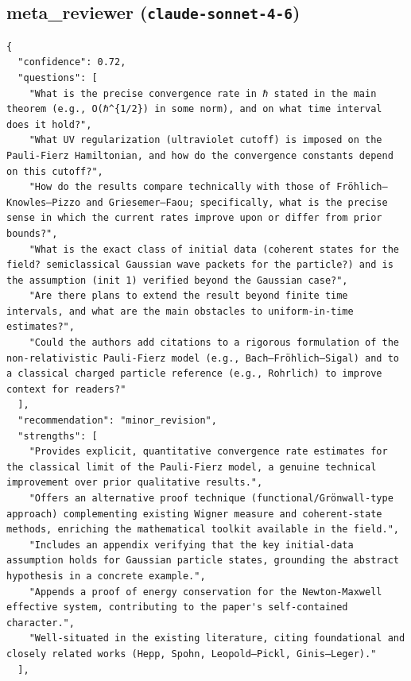 \documentclass[11pt]{article}
\begin{document}
\subsection*{meta_reviewer (\texttt{claude-sonnet-4-6})}
\begin{verbatim}
{
  "confidence": 0.72,
  "questions": [
    "What is the precise convergence rate in ℏ stated in the main theorem (e.g., O(ℏ^{1/2}) in some norm), and on what time interval does it hold?",
    "What UV regularization (ultraviolet cutoff) is imposed on the Pauli-Fierz Hamiltonian, and how do the convergence constants depend on this cutoff?",
    "How do the results compare technically with those of Fröhlich–Knowles–Pizzo and Griesemer–Faou; specifically, what is the precise sense in which the current rates improve upon or differ from prior bounds?",
    "What is the exact class of initial data (coherent states for the field? semiclassical Gaussian wave packets for the particle?) and is the assumption (init 1) verified beyond the Gaussian case?",
    "Are there plans to extend the result beyond finite time intervals, and what are the main obstacles to uniform-in-time estimates?",
    "Could the authors add citations to a rigorous formulation of the non-relativistic Pauli-Fierz model (e.g., Bach–Fröhlich–Sigal) and to a classical charged particle reference (e.g., Rohrlich) to improve context for readers?"
  ],
  "recommendation": "minor_revision",
  "strengths": [
    "Provides explicit, quantitative convergence rate estimates for the classical limit of the Pauli-Fierz model, a genuine technical improvement over prior qualitative results.",
    "Offers an alternative proof technique (functional/Grönwall-type approach) complementing existing Wigner measure and coherent-state methods, enriching the mathematical toolkit available in the field.",
    "Includes an appendix verifying that the key initial-data assumption holds for Gaussian particle states, grounding the abstract hypothesis in a concrete example.",
    "Appends a proof of energy conservation for the Newton-Maxwell effective system, contributing to the paper's self-contained character.",
    "Well-situated in the existing literature, citing foundational and closely related works (Hepp, Spohn, Leopold–Pickl, Ginis–Leger)."
  ],

\end{verbatim}
\end{document}

